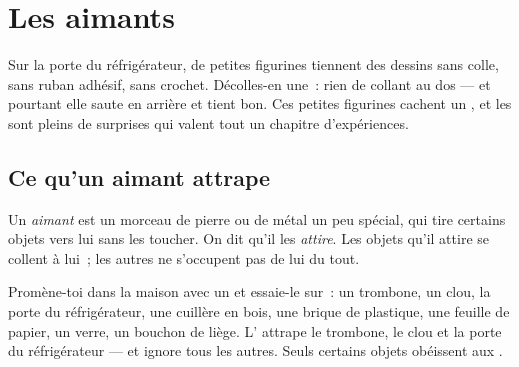 \chapter{Les aimants}\label{ch:g1:magnets}

Sur la porte du réfrigérateur, de petites figurines tiennent des
dessins sans colle, sans ruban adhésif, sans crochet. Décolles-en
une~: rien de collant au dos --- et pourtant elle saute en arrière et
tient bon. Ces petites figurines cachent un , et les 
sont pleins de surprises qui valent tout un chapitre d'expériences.

\section{Ce qu'un aimant attrape}

\begin{definition}[Aimants]\label{def:g1:magnets:magnet}
Un \emph{aimant} est un morceau de pierre ou de métal
un peu spécial, qui tire certains objets vers lui sans les toucher.
On dit qu'il les \emph{attire}. Les objets qu'il
attire se collent à lui~; les autres ne s'occupent pas de lui du
tout.
\end{definition}

\begin{example}\label{ex:g1:magnets:test}
Promène-toi dans la maison avec un  et essaie-le sur~: un
trombone, un clou, la porte du réfrigérateur, une cuillère en bois,
une brique de plastique, une feuille de papier, un verre, un bouchon
de liège. L' attrape le trombone, le clou et la porte du
réfrigérateur --- et ignore tous les autres. Seuls certains objets
obéissent aux .
\end{example}

